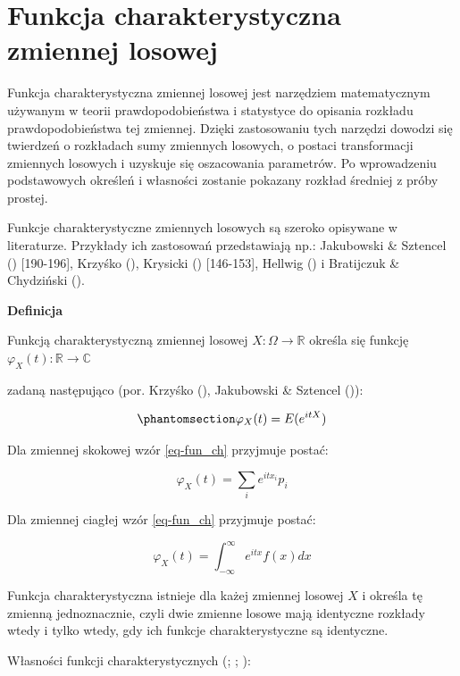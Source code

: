 \documentclass[
  letterpaper,
  DIV=11,
  numbers=noendperiod]{scrreprt}
\begin{document}
\section{Funkcja charakterystyczna zmiennej
losowej}\label{funkcja-charakterystyczna-zmiennej-losowej}

Funkcja charakterystyczna zmiennej losowej jest narzędziem matematycznym
używanym w teorii prawdopodobieństwa i statystyce do opisania rozkładu
prawdopodobieństwa tej zmiennej. Dzięki zastosowaniu tych narzędzi
dowodzi się twierdzeń o rozkładach sumy zmiennych losowych, o postaci
transformacji zmiennych losowych i uzyskuje się oszacowania parametrów.
Po wprowadzeniu podstawowych określeń i własności zostanie pokazany
rozkład średniej z próby prostej.

Funkcje charakterystyczne zmiennych losowych są szeroko opisywane w
literaturze. Przykłady ich zastosowań przedstawiają np.: Jakubowski \&
Sztencel () {[}190-196{]}, Krzyśko
(), Krysicki
() {[}146-153{]}, Hellwig
() i Bratijczuk \&
Chydziński ().

\textbf{Definicja}

Funkcją charakterystyczną zmiennej losowej \(X: \Omega \to \mathbb{R}\)
określa się funkcję \(\varphi_X(t): \mathbb{R} \to \mathbb{C}\)

zadaną następująco (por. Krzyśko (),
Jakubowski \& Sztencel ()):

\begin{equation}\phantomsection\label{eq-fun_ch}{ \varphi_X(t) = E(e^{itX})}\end{equation}

Dla zmiennej skokowej wzór \ref{eq-fun_ch} przyjmuje postać:

\[\varphi_X(t) = \sum_ie^{itx_i}p_i\]

Dla zmiennej ciagłej wzór \ref{eq-fun_ch} przyjmuje postać:

\[\varphi_X(t) = \int_{-\infty}^{\infty}e^{itx}f(x)dx\]

Funkcja charakterystyczna istnieje dla każej zmiennej losowej \(X\) i
określa tę zmienną jednoznacznie, czyli dwie zmienne losowe mają
identyczne rozkłady wtedy i tylko wtedy, gdy ich funkcje
charakterystyczne są identyczne.

Własności funkcji charakterystycznych
(;
;
):
\end{document}
